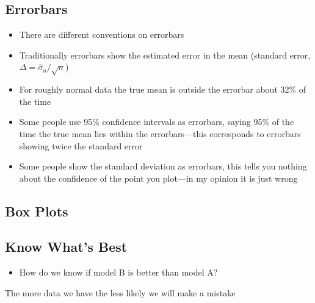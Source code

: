 
\begin{slide}
\section[-2]{Errorbars}

\begin{PauseHighLight}
  \begin{itemize}
  \item There are different conventions on errorbars\pause
  \item Traditionally errorbars show the estimated error in the mean
    (standard error, $\Delta = \hat{\sigma}_n/\sqrt{n}$)\pause
  \item For roughly normal data the true mean is outside the errorbar
    about 32\% of the time\pause
  \item Some people use 95\% confidence intervals as errorbars, saying
    95\% of the time the true mean lies within the
    errorbars\pause---this corresponds to errorbars showing twice the
    standard error\pauseb
  \item Some people show the standard deviation as errorbars\pause,
    this tells you nothing about the confidence of the point you
    plot\pauseb---in my opinion it is just wrong\pauseb
  \end{itemize}
\end{PauseHighLight}

\end{slide}


\begin{slide}
\section[-2]{Box Plots}

\pb
\pause{}
\begin{center}
  \pause
\end{center}

\end{slide}


\Outline %

\begin{slide}
\section[-1]{Know What's Best}

\pb
\begin{itemize}
\item How do we know if model B is better than model A?\pauseh
\end{itemize}
\begin{center}
\pause  
\end{center}
The more data we have the less likely we will make a mistake\pauseb
\end{slide}


